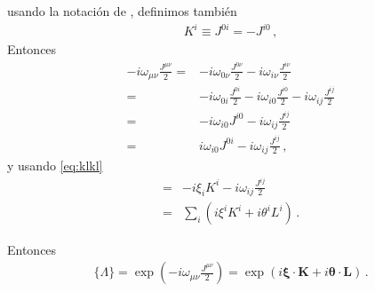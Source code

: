 usando la notación de \cite{0812.1594}, definimos también
\begin{align}
  K^i\equiv J^{0i}=-J^{i0}\,,
\end{align}
Entonces
\begin{align}
-i\omega_{\mu\nu}\frac{{J}^{\mu\nu}}{2} =&-i\omega_{0\nu}\frac{{J}^{0\nu}}{2}
-i\omega_{i\nu}\frac{{J}^{i\nu}}{2}\nonumber\\
=&-i\omega_{0i}\frac{{J}^{0i}}{2}
-i\omega_{i0}\frac{{J}^{i0}}{2}
-i\omega_{ij}\frac{{J}^{ij}}{2}\nonumber\\
=&  -i\omega_{i0}{J}^{i0}
-i\omega_{ij}\frac{{J}^{ij}}{2}\nonumber\\
=&  i\omega_{i0}{J}^{0i}
-i\omega_{ij}\frac{{J}^{ij}}{2}\,,
\end{align}
y usando \eqref{eq:klkl}
\begin{align}
=&  -i\xi_{i}K^{i}-i\omega_{ij}\frac{{J}^{ij}}{2}\nonumber\\
=&\sum_i \left(i\xi^i K^i+i\theta^i L^i  \right)\,.
\end{align}
\begin{frame}
Entonces
\begin{align}
  \{\Lambda\}=\exp\left(-i\omega_{\mu\nu}\frac{{J}^{\mu\nu}}{2}\right)=
\exp\left( i\boldsymbol{\xi}\cdot\mathbf{K}+i\boldsymbol{\theta}\cdot\mathbf{L} \right)\,.
\end{align}


\end{frame}

